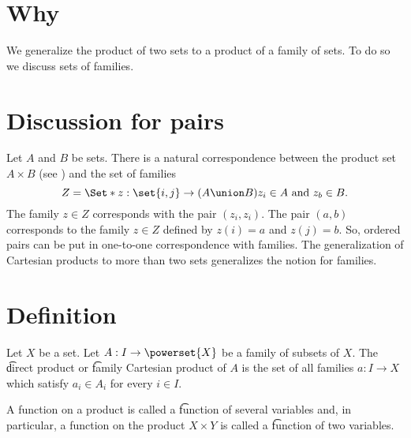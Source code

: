 

\section*{Why}

We generalize the product of two sets to a product of a family of sets.
To do so we discuss sets of families.

\section*{Discussion for pairs}

Let $A$ and $B$ be sets.
There is a natural correspondence between the product set $A \times B$ (see ) and the set of families
    \[
Z = \Set*{z: \set{i, j} \to (A \union B)}{z_i \in A \text{ and } z_b \in B}.
    \]
The family $z \in Z$ corresponds with the pair $(z_i, z_i)$.
The pair $(a, b)$ corresponds to the family $z \in Z$ defined by $z(i) = a$ and $z(j) = b$.
So, ordered pairs can be put in one-to-one correspondence with families.
The generalization of Cartesian products to more than two sets generalizes the notion for families.

\section*{Definition}

Let $X$ be a set.
Let $A: I \to \powerset{X}$ be a family of subsets of $X$.
The \t{direct product} or \t{family Cartesian product} of $A$ is the set of all families $a: I \to X$ which satisfy $a_i \in A_i$ for every $i \in I$.

A function on a product is called a \t{function of several variables} and, in particular, a function on the product $X \times  Y$ is called a \t{function of two variables.}


